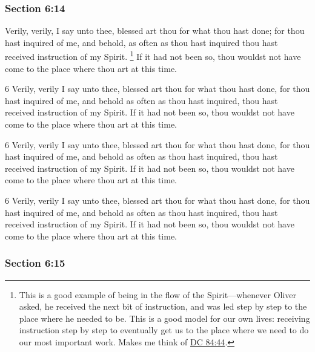 	\subsubsection{Section 6:14} %
		\label{DC6-14}

		Verily, verily, I say unto thee, blessed art thou for what thou hast done; for thou hast inquired of me, and behold, as often as thou hast inquired thou hast received instruction of my Spirit.%
			\footnote{%
				This is a good example of being in the flow of the Spirit---whenever Oliver asked, he received the next bit of instruction, and was led step by step to the place where he needed to be. This is a good model for our own lives: receiving instruction step by step to eventually get us to the place where we need to do our most important work. Makes me think of \hyperref[DC84-44]{DC 84:44}.
				}
		If it had not been so, thou wouldst not have come to the place where thou art at this time.

		\begin{framed}
		\scriptsize
			\begin{compactdesc}
				\item[JSP] 6 Verily, verily I say unto thee, blessed art thou for what thou hast done, for thou hast inquired of me, and behold as often as thou hast inquired, thou hast received instruction of my Spirit. If it had not been so, thou wouldst not have come to the place where thou art at this time.
				\item[DC 1835] 6 Verily, verily I say unto thee, blessed art thou for what thou hast done, for thou hast inquired of me, and behold as often as thou hast inquired, thou hast received instruction of my Spirit. If it had not been so, thou wouldst not have come to the place where thou art at this time.
				\item[DC 1844] 6 Verily, verily I say unto thee, blessed art thou for what thou hast done, for thou hast inquired of me, and behold as often as thou hast inquired, thou hast received instruction of my Spirit. If it had not been so, thou wouldst not have come to the place where thou art at this time.
			\end{compactdesc}
		\end{framed}

	\subsubsection{Section 6:15} %
		\label{DC6-15}

